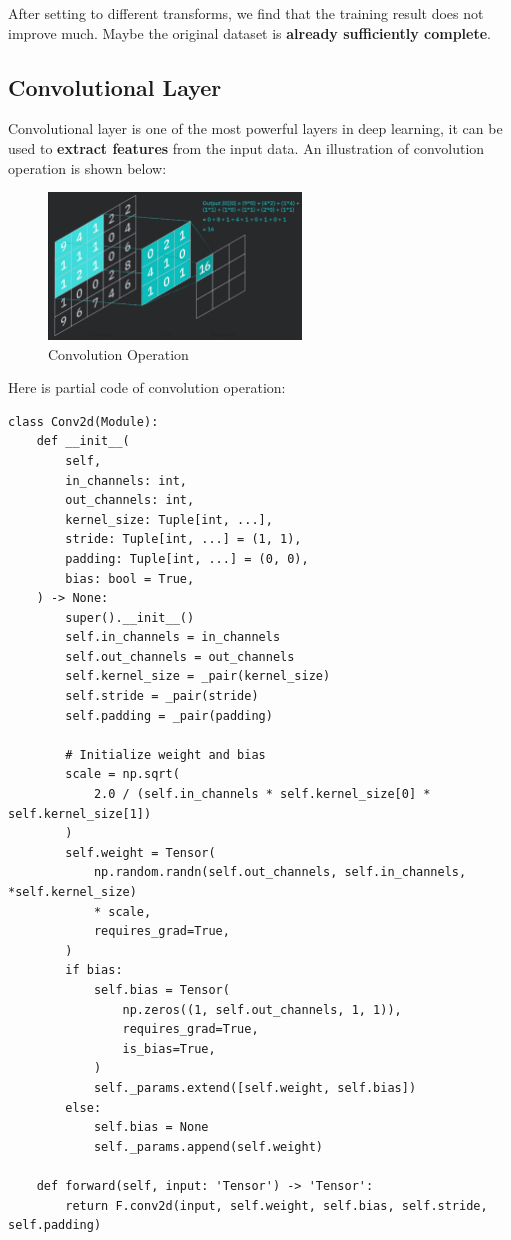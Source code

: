 \documentclass[a4paper, 11pt]{article} %
\begin{document}
After setting to different transforms, we find that the training result does not improve much.
Maybe the original dataset is \textbf{already sufficiently complete}.

\subsection{\textbf{Convolutional Layer}}

Convolutional layer is one of the most powerful layers in deep learning, it can be used to
\textbf{extract features} from the input data. An illustration of convolution operation is
shown below:

\begin{figure}[H]
    \centering
    \includegraphics[width=0.6\textwidth]{./img/conv.jpg}
    \caption{Convolution Operation}
\end{figure}

Here is partial code of convolution operation:

\begin{lstlisting}
class Conv2d(Module):
    def __init__(
        self,
        in_channels: int,
        out_channels: int,
        kernel_size: Tuple[int, ...],
        stride: Tuple[int, ...] = (1, 1),
        padding: Tuple[int, ...] = (0, 0),
        bias: bool = True,
    ) -> None:
        super().__init__()
        self.in_channels = in_channels
        self.out_channels = out_channels
        self.kernel_size = _pair(kernel_size)
        self.stride = _pair(stride)
        self.padding = _pair(padding)

        # Initialize weight and bias
        scale = np.sqrt(
            2.0 / (self.in_channels * self.kernel_size[0] * self.kernel_size[1])
        )
        self.weight = Tensor(
            np.random.randn(self.out_channels, self.in_channels, *self.kernel_size)
            * scale,
            requires_grad=True,
        )
        if bias:
            self.bias = Tensor(
                np.zeros((1, self.out_channels, 1, 1)),
                requires_grad=True,
                is_bias=True,
            )
            self._params.extend([self.weight, self.bias])
        else:
            self.bias = None
            self._params.append(self.weight)

    def forward(self, input: 'Tensor') -> 'Tensor':
        return F.conv2d(input, self.weight, self.bias, self.stride, self.padding)
\end{lstlisting}
\end{document}
